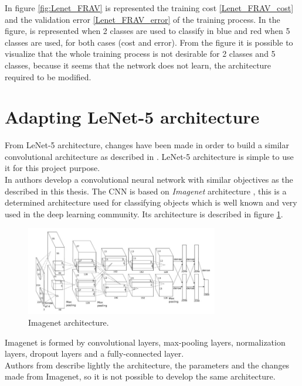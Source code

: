 In figure \ref{fig:Lenet_FRAV} is represented the training cost \ref{Lenet_FRAV_cost} and the validation error \ref{Lenet_FRAV_error} of the training process. In the figure, is represented when 2 classes are used to classify in  blue and red when 5 classes are used, for both cases (cost and error). From the figure it is possible to visualize that the whole training process is not desirable for 2 classes and 5 classes, because it seems that the network does not learn, the architecture required to be modified.

\section{Adapting LeNet-5 architecture} \label{sec:adapt_lenet}
From LeNet-5 architecture, changes have been made in order to build a similar convolutional architecture as described in \cite{yangLL14}. LeNet-5 architecture is simple to use it for this project purpose.\\

In \cite{yangLL14} authors develop a convolutional neural network with similar objectives as the described in this thesis. The CNN is based on \textit{Imagenet} architecture \cite{imagenet}, this is a determined architecture used for classifying objects which is well known and very used in the deep learning community. Its architecture is described in figure \ref{fig:Imagenet_architecture}.\\

\begin{figure}[tb]
\centering
\includegraphics[width=0.75\textwidth]{images_miscelaneus/Imagenet.png}
\caption{Imagenet architecture.} \label{fig:Imagenet_architecture}
\end{figure}

Imagenet is formed by convolutional layers, max-pooling layers, normalization layers, dropout layers and a fully-connected layer.\\

Authors from \cite{yangLL14} describe lightly the architecture, the parameters and the changes made from Imagenet, so it is not possible to develop the same architecture.

